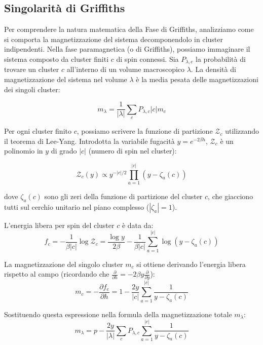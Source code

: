 \subsection{Singolarità di Griffiths}

Per comprendere la natura matematica della Fase di Griffiths, analizziamo come si comporta la magnetizzazione del sistema decomponendolo in cluster indipendenti.
Nella fase paramagnetica (o di Griffiths), possiamo immaginare il sistema composto da cluster finiti $c$ di spin connessi.
Sia $P_{\lambda, c}$ la probabilità di trovare un cluster $c$ all'interno di un volume macroscopico $\lambda$.
La densità di magnetizzazione del sistema nel volume $\lambda$ è la media pesata delle magnetizzazioni dei singoli cluster:

\begin{equation}
m_{\lambda} = \frac{1}{|\lambda|} \sum_{c} P_{\lambda,c} |c| m_c
\end{equation}

\noindent Per ogni cluster finito $c$, possiamo scrivere la funzione di partizione $\mathcal{Z}_c$ utilizzando il teorema di Lee-Yang. Introdotta la variabile fugacità $y = e^{-2\beta h}$, $\mathcal{Z}_c$ è un polinomio in $y$ di grado $|c|$ (numero di spin nel cluster):

\begin{equation}
\mathcal{Z}_c(y) \propto y^{-|c|/2} \prod_{a=1}^{|c|} (y - \zeta_a(c))
\end{equation}

\noindent dove $\zeta_a(c)$ sono gli zeri della funzione di partizione del cluster $c$, che giacciono tutti sul cerchio unitario nel piano complesso ($|\zeta_a| = 1$).

\noindent L'energia libera per spin del cluster $c$ è data da:
\begin{equation}
f_c = -\frac{1}{\beta |c|} \log \mathcal{Z}_c = \frac{\log y}{2\beta} - \frac{1}{\beta |c|} \sum_{a=1}^{|c|} \log(y - \zeta_a(c))
\end{equation}

\noindent La magnetizzazione del singolo cluster $m_c$ si ottiene derivando l'energia libera rispetto al campo (ricordando che $\frac{\partial}{\partial h} = -2\beta y \frac{\partial}{\partial y}$):
\begin{equation}
m_c = - \frac{\partial f_c}{\partial h} = 1 - \frac{2y}{|c|} \sum_{a=1}^{|c|} \frac{1}{y - \zeta_a(c)}
\end{equation}

\noindent Sostituendo questa espressione nella formula della magnetizzazione totale $m_{\lambda}$:
\begin{equation}
m_{\lambda} = p - \frac{2y}{|\lambda|} \sum_{c} P_{\lambda,c} \sum_{a=1}^{|c|} \frac{1}{y - \zeta_a(c)}
\end{equation}

